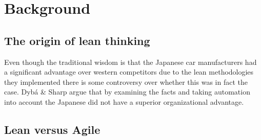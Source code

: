 
\chapter{Background}
\label{chapter:background}

\section{The origin of lean thinking}
\label{section:leanorigins}



Even though the traditional wisdom is that the Japanese car manufacturers had a significant advantage over western competitors due to the lean methodologies they implemented there is some controversy over whether this was in fact the case. Dybá \& Sharp argue that by examining the facts and taking automation into account the Japanese did not have a superior organizational advantage. \cite{Dyba2012WhatS}

\section{Lean versus Agile}
\label{section:leanvsagile}


